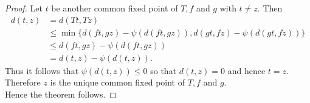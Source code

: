 \documentclass[10pt,a4paper]{amsart}
\begin{document}
\begin{proof}
Let $t$ be another common fixed point of $T,f$ and $g$ with $t\neq z$.
Then
\begin{align*}
d(t,z) &= d(Tt,Tz) \\
&\leq \min\{d(ft,gz)-\psi(d(ft,gz)),d(gt,fz)-\psi(d(gt,fz))\} \\
&\leq d(ft,gz)-\psi(d(ft,gz)) \\
&= d(t,z)-\psi(d(t,z)).
\end{align*}
Thus it follows that $\psi(d(t,z))\leq 0$ so that $d(t,z)=0$ and hence $t=z$.\\
Therefore $z$ is the unique common fixed point of $T,f$ and $g$.\\
Hence the theorem follows.
\end{proof}
\end{document}
